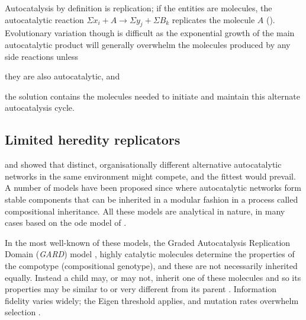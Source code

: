 Autocatalysis by definition is replication; if the entities are molecules, the autocatalytic reaction $\Sigma x_i + A\rightarrow \Sigma y_j + \Sigma B_k$ replicates the molecule $A$ (\eg \textcite{Lifson1997}). Evolutionary variation though is difficult as the exponential growth of the main autocatalytic product will generally overwhelm the molecules produced by any side reactions unless \begin{inparaenum}\item they are also autocatalytic, and \item the solution contains the molecules needed to initiate and maintain this alternate autocatalysis cycle.\end{inparaenum}

\subsection{Limited heredity replicators}\label{variable-replicators}

\Textcite{Ganti:2003hl} and  \textcite{Eigen1971} showed that distinct, organisationally different alternative autocatalytic networks in the same environment might compete, and the fittest would prevail. A number of models have been proposed since where autocatalytic networks form stable components that can be inherited in a modular fashion in a process called compositional inheritance. All these models are analytical in nature, in many cases based on the \gls{ode} model of \cite{Farmer1986}.


In the most well-known of these models, the Graded Autocatalysis Replication Domain (\emph{GARD}) model \parencite{Segre1998}, highly catalytic molecules determine the properties of the compotype (compositional genotype), and these are not necessarily inherited equally. Instead a child may, or may not, inherit one of these molecules and so its properties may be similar to or very different from its parent \parencite{Vasas2015, Vasas2012, Vasas2012a}. Information fidelity varies widely; the Eigen threshold \parencite{Eigen1971} applies, and mutation rates overwhelm selection \parencite{Vasas2015, Vasas2012, Vasas2012a}.

